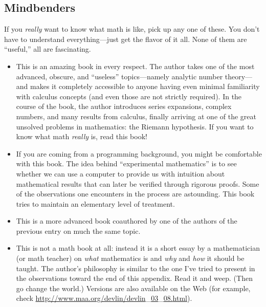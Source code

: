 \subsection{Mindbenders}

If you \emph{really} want to know what math is like, pick up any one
of these. You don't have to understand everything---just get the
flavor of it all. None of them are ``useful,'' all are fascinating.

\begin{itemize}
\item {}
  This is an amazing book in every respect. The author takes one of
  the most advanced, obscure, and ``useless'' topics---namely analytic
  number theory---and makes it completely accessible to anyone having
  even minimal familiarity with calculus concepts (and even those are
  not strictly required). In the course of the book, the author
  introduces series expansions, complex numbers, and many results from
  calculus, finally arriving at one of the great unsolved problems in
  mathematics: the Riemann hypothesis.  If you want to know what math
  \emph{really} is, read this book!

\item {}
  If you are coming from a programming background, you might be
  comfortable with this book. The idea behind ``experimental
  mathematics'' is to see whether we can use a computer to provide us
  with intuition about mathematical results that can later be verified
  through rigorous proofs. Some of the observations one encounters in
  the process are astounding. This book tries to maintain an
  elementary level of treatment.

\item {}
  This is a more advanced book coauthored by one of the authors of the
  previous entry on much the same topic.

\item {}
  This is not a math book at all: instead it is a short essay by a
  mathematician (or math teacher) on \emph{what} mathematics is and
  \emph{why} and \emph{how} it should be taught.  The author's
  philosophy is similar to the one I've tried to present in the
  observations toward the end of this appendix. Read it and weep.
  (Then go change the world.) Versions are also available on the Web
  (for example, check
  \url{http://www.maa.org/devlin/devlin}\_\url{03}\_\url{08.}\break \url{html}).
\end{itemize}

\clearpage
\
\thispagestyle{empty}
\
\clearpage